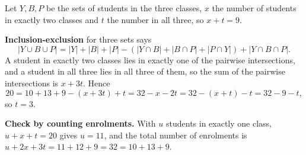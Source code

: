 Let $Y,B,P$ be the sets of students in the three classes, $x$ the number of students in exactly two classes and $t$ the number in all three, so $x+t=9$.

\textbf{Inclusion-exclusion} for three sets says
\[|Y\cup B\cup P|=|Y|+|B|+|P|-\left(|Y\cap B|+|B\cap P|+|P\cap Y|\right)+|Y\cap B\cap P|.\]
A student in exactly two classes lies in exactly one of the pairwise intersections, and a student in all three lies in all three of them, so the sum of the pairwise intersections is $x+3t$. Hence
\[20=10+13+9-(x+3t)+t=32-x-2t=32-(x+t)-t=32-9-t,\]
so $t=\boxed{3}$.

\textbf{Check by counting enrolments.} With $u$ students in exactly one class, $u+x+t=20$ gives $u=11$, and the total number of enrolments is $u+2x+3t=11+12+9=32=10+13+9$.
